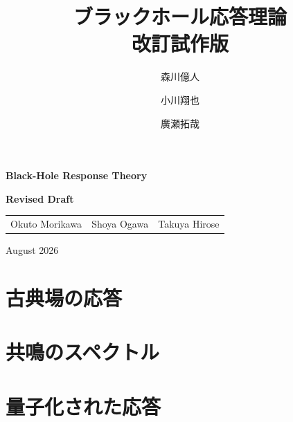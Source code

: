 \documentclass[uplatex,dvipdfmx,11pt,openany]{jsbook}
\title{%
  \Huge ブラックホール応答理論\\[5ex]
  \large 改訂試作版}
\author{%
  \Large 森川億人
  \and
  \Large 小川翔也
  \and
  \Large 廣瀬拓哉}
\date{}
\newif\ifappendixmode
\let\originalappendix\appendix
\renewcommand{\appendix}{\originalappendix\appendixmodetrue}
\theoremstyle{definition}
\begin{document}
\frontmatter
\maketitle
\clearpage
\thispagestyle{empty}

\begin{center}

\vspace*{3cm}

{\LARGE\bfseries Black-Hole Response Theory\par}

\vspace{0.8cm}

{\large\bfseries Revised Draft\par}

\vspace{2cm}

\begin{tabular}{ccc}
  {\large Okuto Morikawa}
    & {\large Shoya Ogawa}
    & {\large Takuya Hirose}
\end{tabular}

\vfill

{\large August 2026\par}

\end{center}

\clearpage

\clearpage

\tableofcontents
\clearpage

\mainmatter
\part{古典場の応答}






\part{共鳴のスペクトル}



\part{量子化された応答}






\appendix


\backmatter


\printindex


\end{document}
